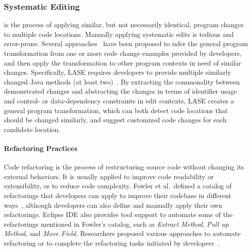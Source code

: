 \documentclass[runningheads,a4paper]{llncs}
\begin{document}
\subsubsection{Systematic Editing} is the process of applying similar, but not necessarily identical, program changes to multiple code locations. 
Manually applying systematic edits is tedious and error-prone. 
Several approaches~\cite{MKM2011,MKM2013,Rolim:2017} have been proposed to infer the general program transformation from one or more code change examples provided by developers, and then apply the transformation to other program contexts in need of similar changes. Specifically, LASE requires developers to provide multiple similarly changed Java methods (at least two)~\cite{MKM2013}. By extracting the commonality between demonstrated changes and abstracting the changes in terms of identifier usage and control- or data-dependency constraints in edit contexts, LASE creates a general program transformation, which can both detect code locations that should be changed similarly, and suggest customized code changes for each candidate location.





\paragraph{Refactoring Practices} 
Code refactoring is the process of restructuring source code without changing its external behaviors. It is usually applied to improve code readability or extensibility, or to reduce code complexity. 
Fowler et al.~defined a catalog of refactorings that developers can apply to improve their codebase in different ways~\cite{1999:RID}, although developers can also define and manually apply their own refactorings. Eclipse IDE also provides tool support to automate some of the refactorings mentioned in Fowler's catalog, such as \emph{Extract Method}, \emph{Pull up Method}, and \emph{Move Field}. Researchers proposed various approaches to automate refactoring or to complete the refactoring tasks initiated by developers~\cite{Griswold:1992,Balazinska1999,Dig:2009,Ge:2012,Chen:2013,Lee:2013,Tsantalis2013:icsm,Meng:2015,Kim:2016}.
\end{document}
